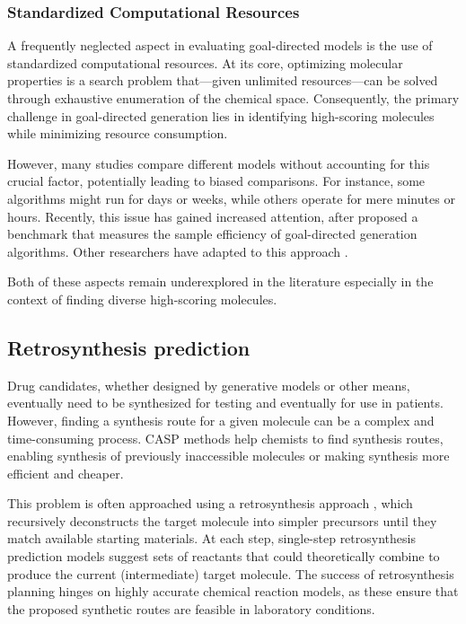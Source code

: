 \subsubsection{Standardized Computational Resources}
A frequently neglected aspect in evaluating goal-directed models is the use of standardized
computational resources. At its core, optimizing molecular properties is a search problem
that—given unlimited resources—can be solved through exhaustive enumeration of the chemical space.
Consequently, the primary challenge in goal-directed generation lies in identifying high-scoring molecules
while minimizing resource consumption.

However, many studies compare different models without accounting for this crucial factor,
potentially leading to biased comparisons. For instance, some algorithms might run for days or
weeks, while others operate for mere minutes or hours. Recently, this issue has gained increased
attention, after \citep{gaoSampleEfficiencyMatters2022} proposed a benchmark that measures
the sample efficiency of goal-directed generation algorithms. Other researchers have adapted to this approach
\citep{thomasReevaluatingSampleEfficiency2022,thomasAugmentedHillClimbIncreases2022,guoAugmentedMemoryCapitalizing2023}.

Both of these aspects remain underexplored in the literature especially in the context of finding
diverse high-scoring molecules.

\subsection{Retrosynthesis prediction}
Drug candidates, whether designed by generative models or other means, eventually need to be
synthesized for testing and eventually for use in patients. However, finding a synthesis route for a
given molecule can be a complex and time-consuming process. \Ac{CASP} methods help
chemists to find synthesis routes, enabling synthesis of previously inaccessible molecules or making
synthesis more efficient and cheaper.

This problem is often approached using a retrosynthesis approach
\citep{coreyComputerAssistedDesignComplex1969,coreyLogicChemicalSynthesis1991a}, which
recursively deconstructs the target molecule into simpler precursors until they match available
starting materials. At each step, single-step retrosynthesis prediction models suggest sets of
reactants that could theoretically combine to produce the current (intermediate) target molecule.
The success of retrosynthesis planning hinges on highly accurate chemical reaction models, as these
ensure that the proposed synthetic routes are feasible in laboratory conditions.

